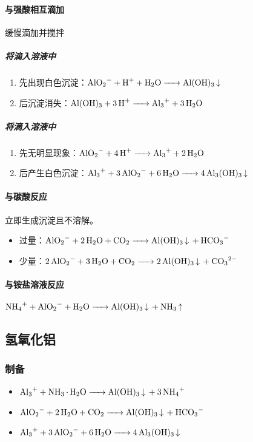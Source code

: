 \documentclass[a4paper]{article}
\begin{document}
	\paragraph{与强酸相互滴加}缓慢滴加并搅拌
	\subparagraph{将滴入溶液中}
	\begin{enumerate}
		\item 先出现白色沉淀：$\ce{AlO2- + H+ + H2O -> Al(OH)3 v}\\$
		\item 后沉淀消失：$\ce{Al(OH)3 + 3H+ -> Al3+ + 3H2O}\\$
	\end{enumerate}
	\subparagraph{将滴入溶液中}
	\begin{enumerate}
		\item 先无明显现象：$\ce{AlO2- + 4H+ -> Al3+ + 2H2O}\\$
		\item 后产生白色沉淀：$\ce{Al3+ + 3AlO2- + 6H2O -> 4Al3(OH)3 v}\\$
	\end{enumerate}
	\paragraph{与碳酸反应}
	立即生成沉淀且不溶解。
	\begin{itemize}
		\item {}过量：$\ce{AlO2- + 2H2O + CO2 -> Al(OH)3 v + HCO3-}\\$
		\item {}少量：$\ce{2AlO2- + 3H2O + CO2 -> 2Al(OH)3 v + CO3^2-}\\$
	\end{itemize}
	\paragraph{与铵盐溶液反应}
	$\ce{NH4+ + AlO2- + H2O -> Al(OH)3 v + NH3 ^}\\$
	
	\subsection{氢氧化铝}
	\subsubsection{制备}
	\begin{itemize}
		\item $\ce{Al3+ + NH3*H2O -> Al(OH)3 v + 3NH4+}\\$
		\item $\ce{AlO2- + 2H2O + CO2 -> Al(OH)3 v + HCO3-}\\$
		\item $\ce{Al3+ + 3AlO2- + 6H2O -> 4Al3(OH)3 v}\\$
	\end{itemize}
	
\end{document}
